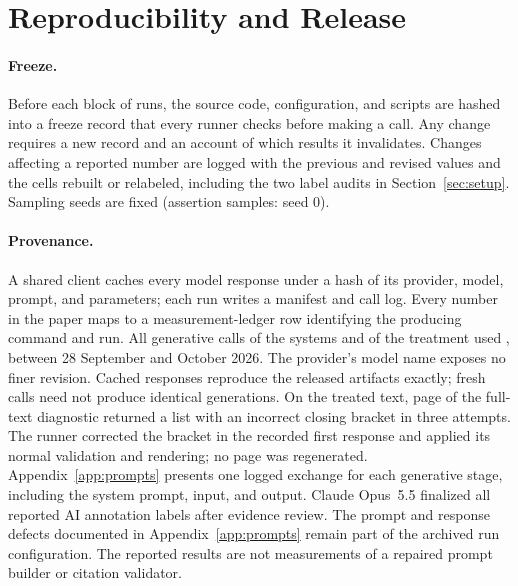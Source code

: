 \section{Reproducibility and Release}
\label{app:reproducibility}

\paragraph{Freeze.} Before each block of runs, the source code, configuration, and scripts
are hashed into a freeze record that every runner checks before making a call. Any change
requires a new record and an account of which results it invalidates. Changes affecting a
reported number are logged with the previous and revised values and the cells rebuilt or
relabeled, including the two label audits in Section~\ref{sec:setup}.
Sampling seeds are fixed (assertion samples: seed 0).

\paragraph{Provenance.} A shared client caches every model response under a hash of its
provider, model, prompt, and parameters; each run writes a manifest and call log. Every number
in the paper maps to a measurement-ledger row identifying the producing command and run.
All generative calls of the systems and of the treatment used , between 28 September and
\fi{} October 2026. The provider's model name exposes no finer revision.
Cached responses reproduce the released artifacts exactly; fresh calls need not produce
identical generations.\ifnwdecon{} On the treated text,  page of the
full-text diagnostic returned a list with an incorrect closing bracket in three attempts.
The runner corrected the bracket in the recorded first response and applied its normal
validation and rendering; no page was regenerated.\fi{} Appendix~\ref{app:prompts} presents
one logged exchange for each generative stage, including the system prompt, input, and
output. Claude Opus~5.5 finalized all reported AI annotation labels after evidence review.
The prompt and response defects documented in Appendix~\ref{app:prompts} remain part of
the archived run configuration. The reported results are not measurements of a repaired
prompt builder or citation validator.

